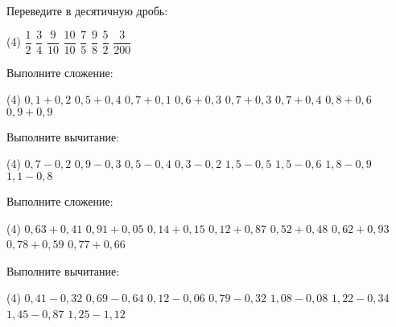 \begin{class}[number=2]
	\begin{listofex}
		\item Переведите в десятичную дробь:
		\begin{tasks}(4)
			\task \( \dfrac{1}{2} \)
			\task \( \dfrac{3}{4} \)
			\task \( \dfrac{9}{10} \)
			\task \( \dfrac{10}{10} \)
			\task \( \dfrac{7}{5} \)
			\task \( \dfrac{9}{8} \)
			\task \( \dfrac{5}{2} \)
			\task \( \dfrac{3}{200} \)
		\end{tasks}
		\item Выполните сложение:
		\begin{tasks}(4)
			\task \( 0,1+0,2 \)
			\task \( 0,5+0,4 \)
			\task \( 0,7+0,1 \)
			\task \( 0,6+0,3 \)
			\task \( 0,7+0,3 \)
			\task \( 0,7+0,4 \)
			\task \( 0,8+0,6 \)
			\task \( 0,9+0,9 \)
		\end{tasks}
		\item Выполните вычитание:
		\begin{tasks}(4)
			\task \( 0,7-0,2 \)
			\task \( 0,9-0,3 \)
			\task \( 0,5-0,4 \)
			\task \( 0,3-0,2 \)
			\task \( 1,5-0,5 \)
			\task \( 1,5-0,6 \)
			\task \( 1,8-0,9 \)
			\task \( 1,1-0,8 \)
		\end{tasks}
		\item Выполните сложение:
		\begin{tasks}(4)
			\task \( 0,63+0,41 \)
			\task \( 0,91+0,05 \)
			\task \( 0,14+0,15 \)
			\task \( 0,12+0,87 \)
			\task \( 0,52+0,48 \)
			\task \( 0,62+0,93 \)
			\task \( 0,78+0,59 \)
			\task \( 0,77+0,66 \)
		\end{tasks}
		\item Выполните вычитание:
		\begin{tasks}(4)
			\task \( 0,41-0,32 \)
			\task \( 0,69-0,64 \)
			\task \( 0,12-0,06 \)
			\task \( 0,79-0,32 \)
			\task \( 1,08-0,08 \)
			\task \( 1,22-0,34 \)
			\task \( 1,45-0,87 \)
			\task \( 1,25-1,12 \)
		\end{tasks}
	\end{listofex}
\end{class}

